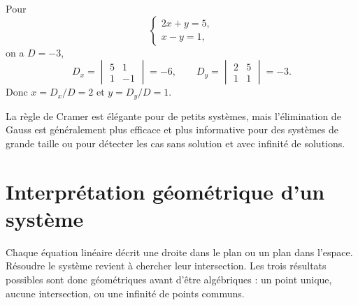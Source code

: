 \documentclass[12pt,a4paper,openany]{book}
\begin{document}
\begin{examplebox}
Pour
\[
\begin{cases}
2x+y=5,\\
x-y=1,
\end{cases}
\]
on a $D=-3$,
\[
D_x=\begin{vmatrix}5&1\\1&-1\end{vmatrix}=-6,
\qquad
D_y=\begin{vmatrix}2&5\\1&1\end{vmatrix}=-3.
\]
Donc $x=D_x/D=2$ et $y=D_y/D=1$.
\end{examplebox}

\begin{warningbox}
La règle de Cramer est élégante pour de petits systèmes, mais l'élimination de Gauss est généralement plus efficace et plus informative pour des systèmes de grande taille ou pour détecter les cas sans solution et avec infinité de solutions.
\end{warningbox}


\section{Interprétation géométrique d'un système}

\begin{visualbox}
Chaque équation linéaire décrit une droite dans le plan ou un plan dans l'espace. Résoudre le système revient à chercher leur intersection. Les trois résultats possibles sont donc géométriques avant d'être algébriques : un point unique, aucune intersection, ou une infinité de points communs.
\end{visualbox}

\begin{center}
\qquad
{}
\qquad
{}
\end{center}
\end{document}
